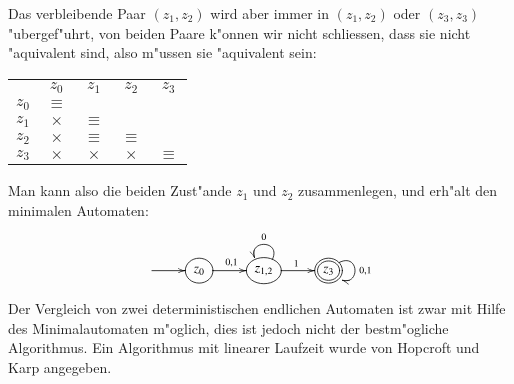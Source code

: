 Das verbleibende Paar $(z_1,z_2)$ wird aber immer in $(z_1,z_2)$ 
oder $(z_3,z_3)$ "ubergef"uhrt, von beiden Paare k"onnen wir nicht
schliessen, dass sie nicht "aquivalent sind, also m"ussen sie "aquivalent
sein:
\begin{center}
\begin{tabular}{ccccc}
     &$z_0$   &$z_1$   &$z_2$   &$z_3$   \\
$z_0$&$\equiv$&        &        &        \\
$z_1$&$\times$&$\equiv$&        &        \\
$z_2$&$\times$&$\equiv$&$\equiv$&        \\
$z_3$&$\times$&$\times$&$\times$&$\equiv$
\end{tabular}
\end{center}
Man kann also die beiden Zust"ande $z_1$ und $z_2$ zusammenlegen,
und erh"alt den minimalen Automaten:
\[
\entrymodifiers={++[o][F]}
\xymatrix{
*+\txt{} \ar[r]
	&{z_0}\ar[r]^{0,1} 
		&{z_{1,2}}\ar@(ur,ul)_{0}\ar[r]^1
			&*++[o][F=]{z_3}\ar@(ur,dr)^{0,1}
}
\]

Der Vergleich von zwei deterministischen endlichen Automaten ist zwar
mit Hilfe des Minimalautomaten m"oglich, dies ist jedoch nicht der
bestm"ogliche Algorithmus.
Ein Algorithmus mit linearer Laufzeit wurde von Hopcroft und Karp
angegeben.

